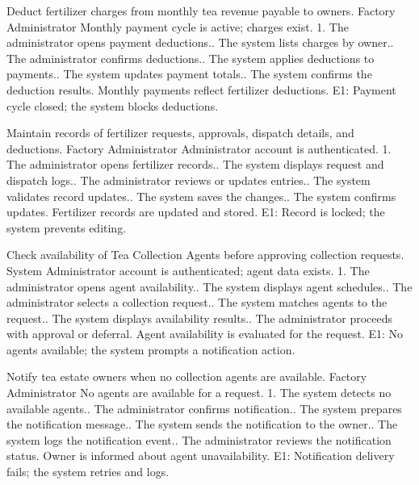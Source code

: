 {Deduct fertilizer charges from monthly tea revenue payable to owners.}
{Factory Administrator}
{Monthly payment cycle is active; charges exist.}
{1. The administrator opens payment deductions.. The system lists charges by owner.. The administrator confirms deductions.. The system applies deductions to payments.. The system updates payment totals.. The system confirms the deduction results.}
{Monthly payments reflect fertilizer deductions.}
{E1: Payment cycle closed; the system blocks deductions.}

{Maintain records of fertilizer requests, approvals, dispatch details, and deductions.}
{Factory Administrator}
{Administrator account is authenticated.}
{1. The administrator opens fertilizer records.. The system displays request and dispatch logs.. The administrator reviews or updates entries.. The system validates record updates.. The system saves the changes.. The system confirms updates.}
{Fertilizer records are updated and stored.}
{E1: Record is locked; the system prevents editing.}


{Check availability of Tea Collection Agents before approving collection requests.}
{System}
{Administrator account is authenticated; agent data exists.}
{1. The administrator opens agent availability.. The system displays agent schedules.. The administrator selects a collection request.. The system matches agents to the request.. The system displays availability results.. The administrator proceeds with approval or deferral.}
{Agent availability is evaluated for the request.}
{E1: No agents available; the system prompts a notification action.}

{Notify tea estate owners when no collection agents are available.}
{Factory Administrator}
{No agents are available for a request.}
{1. The system detects no available agents.. The administrator confirms notification.. The system prepares the notification message.. The system sends the notification to the owner.. The system logs the notification event.. The administrator reviews the notification status.}
{Owner is informed about agent unavailability.}
{E1: Notification delivery fails; the system retries and logs.}

